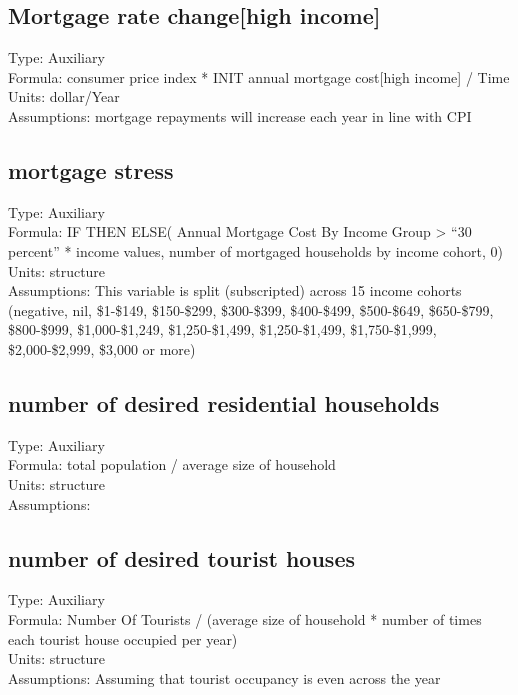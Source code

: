 \documentclass[
  11pt,
]{book}
\begin{document}
\hypertarget{mortgage-rate-changehigh-income}{%
\subsection{Mortgage rate change{[}high income{]}}\label{mortgage-rate-changehigh-income}}

Type: Auxiliary\\
Formula: consumer price index * INIT annual mortgage cost{[}high income{]} / Time\\
Units: dollar/Year\\
Assumptions: mortgage repayments will increase each year in line with CPI

\hypertarget{mortgage-stress}{%
\subsection{mortgage stress}\label{mortgage-stress}}

Type: Auxiliary\\
Formula: IF THEN ELSE( Annual Mortgage Cost By Income Group \textgreater{} ``30 percent'' * income values, number of mortgaged households by income cohort, 0)\\
Units: structure\\
Assumptions: This variable is split (subscripted) across 15 income cohorts (negative, nil, \$1-\$149, \$150-\$299, \$300-\$399, \$400-\$499, \$500-\$649, \$650-\$799, \$800-\$999, \$1,000-\$1,249, \$1,250-\$1,499, \$1,250-\$1,499, \$1,750-\$1,999, \$2,000-\$2,999, \$3,000 or more)

\hypertarget{number-of-desired-residential-households}{%
\subsection{number of desired residential households}\label{number-of-desired-residential-households}}

Type: Auxiliary\\
Formula: total population / average size of household\\
Units: structure\\
Assumptions:

\hypertarget{number-of-desired-tourist-houses}{%
\subsection{number of desired tourist houses}\label{number-of-desired-tourist-houses}}

Type: Auxiliary\\
Formula: Number Of Tourists / (average size of household * number of times each tourist house occupied per year)\\
Units: structure\\
Assumptions: Assuming that tourist occupancy is even across the year
\end{document}
